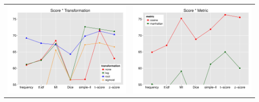 \documentclass[t]{beamer} %
\begin{document}
\begin{frame}
{\begin{tabular}{c@{}c}
      \includegraphics[scale=0.30]{img/lapesa_toefl_main_score_transformation} &
      \includegraphics[scale=0.30]{img/lapesa_toefl_main_score_metric}
    \end{tabular}
  }
\end{frame}
\end{document}
